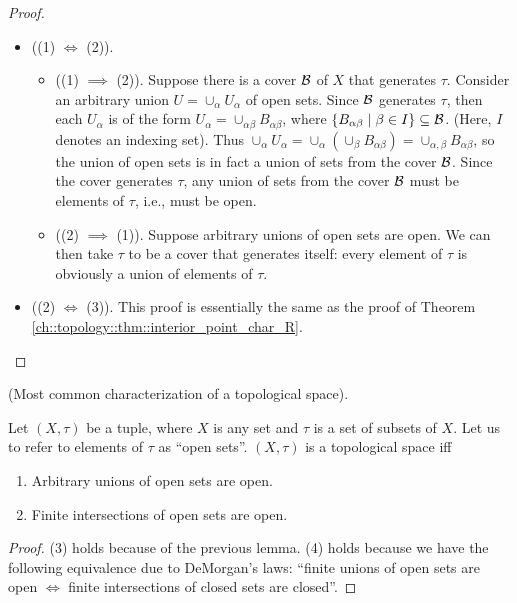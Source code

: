 \begin{proof}
    \mbox{} \\
    \begin{itemize}
        \item ((1) $\iff$ (2)).
        \begin{itemize}
                \item ((1) $\implies$ (2)). Suppose there is a cover $\mathcal{B}$ of $X$ that generates $\tau$. Consider an arbitrary union $U = \cup_\alpha U_\alpha$ of open sets. Since $\mathcal{B}$ generates $\tau$, then each $U_\alpha$ is of the form $U_\alpha = \cup_{\alpha \beta} B_{\alpha \beta}$, where $\{ B_{\alpha \beta} \mid \beta \in I\} \subseteq \mathcal{B}$. (Here, $I$ denotes an indexing set). Thus $\cup_\alpha U_\alpha = \cup_\alpha (\cup_\beta B_{\alpha \beta}) = \cup_{\alpha, \beta} B_{\alpha \beta}$, so the union of open sets is in fact a union of sets from the cover $\mathcal{B}$. Since the cover generates $\tau$, any union of sets from the cover $\mathcal{B}$ must be elements of $\tau$, i.e., must be open. 
                \item ((2) $\implies$ (1)). Suppose arbitrary unions of open sets are open. We can then take $\tau$ to be a cover that generates itself: every element of $\tau$ is obviously a union of elements of $\tau$.
            \end{itemize}
            \item ((2) $\iff$ (3)). This proof is essentially the same as the proof of Theorem \ref{ch::topology::thm::interior_point_char_R}.
    \end{itemize}
\end{proof}

\begin{theorem}
\label{ch::topology::thm::topological_space}
    (Most common characterization of a topological space).
    
    Let $(X, \tau)$ be a tuple, where $X$ is any set and $\tau$ is a set of subsets of $X$. Let us to refer to elements of $\tau$ as ``open sets''. $(X, \tau)$ is a topological space iff

    \begin{enumerate}
        \item[3.] Arbitrary unions of open sets are open.
        \item[4.] Finite intersections of open sets are open.
    \end{enumerate}
\end{theorem}

\begin{proof}
    (3) holds because of the previous lemma. (4) holds because we have the following equivalence due to DeMorgan's laws: ``finite unions of open sets are open $\iff$ finite intersections of closed sets are closed''.
\end{proof}

